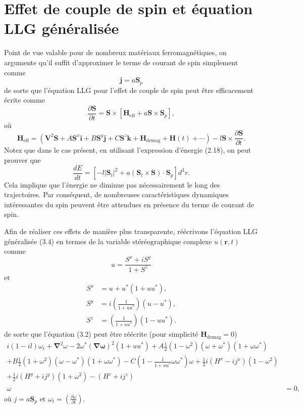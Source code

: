 \documentclass{article}
\begin{document}
	\section{Effet de couple de spin et équation LLG généralisée}
	
	Point de vue valable pour de nombreux matériaux ferromagnétiques, on argumente qu'il suffit d'approximer le terme de courant de spin simplement comme
	\[
	\mathbf{j} = a\mathbf{S}_p \tag{3.3}
	\]
	de sorte que l'équation LLG pour l'effet de couple de spin peut être efficacement écrite comme
	\[
	\frac{\partial \mathbf{S}}{\partial t} = \mathbf{S} \times [\mathbf{H}_{\text{eff}} + a\mathbf{S} \times \mathbf{S}_p], \tag{3.4}
	\]
	où
	\[
	\mathbf{H}_{\text{eff}} = \left(\mathbf{V}^2\mathbf{S} + A\mathbf{S}^{x}\mathbf{i} + B\mathbf{S}^{y}\mathbf{j} + C\mathbf{S}^{z}\mathbf{k} + \mathbf{H}_{\text{demag}} + \mathbf{H}(t) + \cdots \right) - l\mathbf{S} \times \frac{\partial \mathbf{S}}{\partial t}. \tag{3.5}
	\]
	Notez que dans le cas présent, en utilisant l'expression d'énergie (2.18), on peut prouver que
	\[
	\frac{dE}{dt} = [-l|\mathbf{S}_t|^2 + a(\mathbf{S}_t \times \mathbf{S}) \cdot \mathbf{S}_p]d^3r. \tag{3.6}
	\]
	Cela implique que l'énergie ne diminue pas nécessairement le long des trajectoires. Par conséquent, de nombreuses caractéristiques dynamiques intéressantes du spin peuvent être attendues en présence du terme de courant de spin.
	
	Afin de réaliser ces effets de manière plus transparente, réécrivons l'équation LLG généralisée (3.4) en termes de la variable stéréographique complexe
	$u(\mathbf{r}, t)$ \cite{ref9} comme
	\[
	u = \frac{S^{x} + iS^{y}}{1 + S^{z}} \tag{3.7a}
	\]
	et
	\begin{align*}
	S^{x} &= u + u^*\left(1 + uu^*\right), \\
	S^{y} &= i\left(\frac{1}{1 + uu^*}\right)(u - u^*), \\
	S^{z} &= \left(\frac{1}{1 + uu^*}\right)(1 - uu^*).
	\end{align*}
	de sorte que l'équation (3.2) peut être réécrite (pour simplicité $\mathbf{H}_{\text{demag}} = 0$)
	\begin{align*}
	i(1 - il)\omega_t + \mathbf{\nabla}^2\omega - 2\omega^*(\mathbf{\nabla\omega})^2(1 + uu^*) + A\frac{1}{2}(1 - \omega^2)(\omega + \omega^*)(1 + \omega\omega^*) \\
	+ B\frac{1}{2}(1 + \omega^2)(\omega - \omega^*)(1 + \omega\omega^*) - C\left(1 - \frac{1}{1 + uu^*}\omega\omega^*\right)\omega + \frac{1}{2}i(H^{x} - ij^{x})(1 - \omega^2)\\
	+ \frac{1}{2}i(H^{y} + ij^{y})(1 + \omega^2) - (H^{z} + ij^{z})\\ 
	\omega &= 0 \tag{3.8},
	\end{align*}
	où $j = a\mathbf{S}_p$ et $\omega_t = \left(\frac{\partial\omega}{\partial t}\right)$.
	
\end{document}
